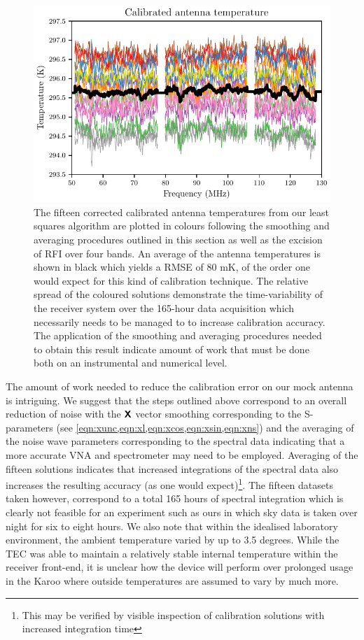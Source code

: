 \begin{figure}
    \centering
    \includegraphics[width=.8\textwidth]{nima_result}
    \caption{The fifteen corrected calibrated antenna temperatures from our least squares algorithm are plotted in colours following the smoothing and averaging procedures outlined in this section as well as the excision of RFI over four bands. An average of the antenna temperatures is shown in black which yields a RMSE of 80 mK, of the order one would expect for this kind of calibration technique. The relative spread of the coloured solutions demonstrate the time-variability of the receiver system over the 165-hour data acquisition which necessarily needs to be managed to to increase calibration accuracy. The application of the smoothing and averaging procedures needed to obtain this result indicate amount of work that must be done both on an instrumental and numerical level.}
    \label{fig:nima_result}
\end{figure}

The amount of work needed to reduce the calibration error on our mock antenna is intriguing. We suggest that the steps outlined above correspond to an overall reduction of noise with the $\textbf{\textsf{X}}$ vector smoothing corresponding to the S-parameters (see \cref{eqn:xunc,eqn:xl,eqn:xcos,eqn:xsin,eqn:xns}) and the averaging of the noise wave parameters corresponding to the spectral data indicating that a more accurate VNA and spectrometer may need to be employed. Averaging of the fifteen solutions indicates that increased integrations of the spectral data also increases the resulting accuracy (as one would expect)\footnote{This may be verified by visible inspection of calibration solutions with increased integration time}. The fifteen datasets taken however, correspond to a total 165 hours of spectral integration which is clearly not feasible for an experiment such as ours in which sky data is taken over night for six to eight hours. We also note that within the idealised laboratory environment, the ambient temperature varied by up to 3.5 degrees. While the TEC was able to maintain a relatively stable internal temperature within the receiver front-end, it is unclear how the device will perform over prolonged usage in the Karoo where outside temperatures are assumed to vary by much more. 

